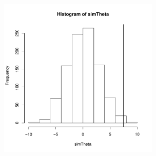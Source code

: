 \documentclass[aspectratio=169]{beamer}
\begin{document}
\begin{frame}
  \includegraphics[width=3in]{permute.pdf}
\end{frame}
\end{document}
